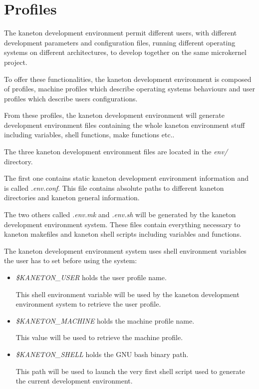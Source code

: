 \section{Profiles}

The kaneton development environment permit different users, with different
development parameters and configuration files, running different operating
systems on different architectures, to develop together on the same
microkernel project.

To offer these functionalities, the kaneton development environment is
composed of profiles, machine profiles which describe operating systems
behaviours and user profiles which describe users configurations.

From these profiles, the kaneton development environment will generate
development environment files containing the whole kaneton environment
stuff including variables, shell functions, make functions etc..

The three kaneton development environment files are located in the
\textit{env/} directory.

The first one contains static kaneton development environment information
and is called \textit{.env.conf}. This file contains absolute paths
to different kaneton directories and kaneton general information.

The two others called \textit{.env.mk} and \textit{.env.sh} will be generated
by the kaneton development environment system. These files contain
everything necessary to kaneton makefiles and kaneton shell scripts
including variables and functions.

The kaneton development environment system uses shell environment variables
the user has to set before using the system:

\begin{itemize}
  \item
    \textit{\$KANETON\_USER} holds the user profile name.

    This shell environment variable will be used by the kaneton development
    environment system to retrieve the user profile.
  \item
    \textit{\$KANETON\_MACHINE} holds the machine profile name.

    This value will be used to retrieve the machine profile.
  \item
    \textit{\$KANETON\_SHELL} holds the GNU bash binary path.

    This path will be used to launch the very first shell script used to
    generate the current development environment.
\end{itemize}

